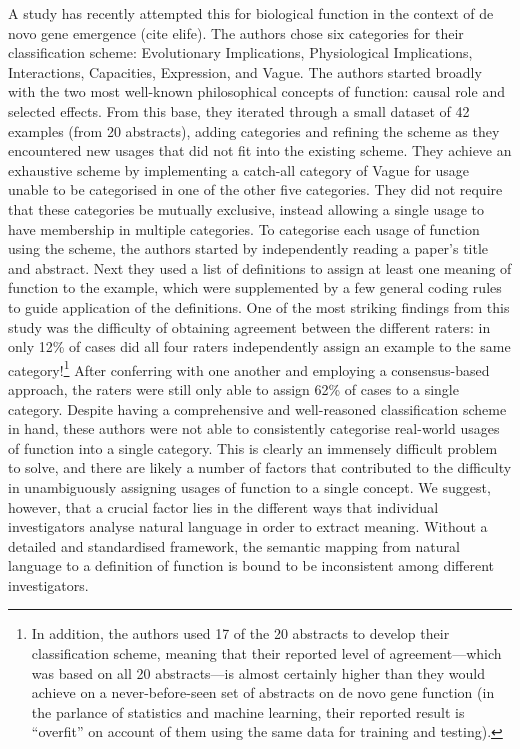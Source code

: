 \documentclass{article}
\begin{document}
A study has recently attempted this for biological function in the context of de novo gene emergence (cite elife).
The authors chose six categories for their classification scheme: Evolutionary Implications, Physiological Implications, Interactions, Capacities, Expression, and Vague.
The authors started broadly with the two most well-known philosophical concepts of function: causal role and selected effects.
From this base, they iterated through a small dataset of 42 examples (from 20 abstracts), adding categories and refining the scheme as they encountered new usages that did not fit into the existing scheme.
They achieve an exhaustive scheme by implementing a catch-all category of Vague for usage unable to be categorised in one of the other five categories.
They did not require that these categories be mutually exclusive, instead allowing a single usage to have membership in multiple categories.
To categorise each usage of function using the scheme, the authors started by independently reading a paper's title and abstract.
Next they used a list of definitions to assign at least one meaning of function to the example, which were supplemented by a few general coding rules to guide application of the definitions.
One of the most striking findings from this study was the difficulty of obtaining agreement between the different raters: in only 12\% of cases did all four raters independently assign an example to the same category!\footnote{In addition, the authors used 17 of the 20 abstracts to develop their classification scheme, meaning that their reported level of agreement---which was based on all 20 abstracts---is almost certainly higher than they would achieve on a never-before-seen set of abstracts on de novo gene function (in the parlance of statistics and machine learning, their reported result is ``overfit'' on account of them using the same data for training and testing).}
After conferring with one another and employing a consensus-based approach, the raters were still only able to assign 62\% of cases to a single category.
Despite having a comprehensive and well-reasoned classification scheme in hand, these authors were not able to consistently categorise real-world usages of function into a single category.
This is clearly an immensely difficult problem to solve, and there are likely a number of factors that contributed to the difficulty in unambiguously assigning usages of function to a single concept.
We suggest, however, that a crucial factor lies in the different ways that individual investigators analyse natural language in order to extract meaning.
Without a detailed and standardised framework, the semantic mapping from natural language to a definition of function is bound to be inconsistent among different investigators.
\end{document}
